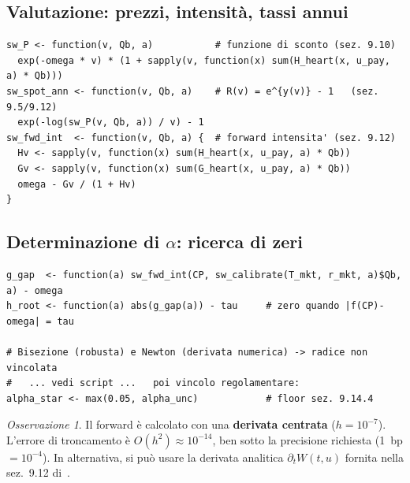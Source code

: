 \documentclass[11pt,a4paper]{article}
\theoremstyle{plain}
\theoremstyle{definition}
\theoremstyle{remark}
\newtheorem*{osservazione}{Osservazione}
\begin{document}
\subsection{Valutazione: prezzi, intensità, tassi annui}

\begin{codebox}
\begin{Verbatim}[fontsize=\small]
sw_P <- function(v, Qb, a)           # funzione di sconto (sez. 9.10)
  exp(-omega * v) * (1 + sapply(v, function(x) sum(H_heart(x, u_pay, a) * Qb)))
sw_spot_ann <- function(v, Qb, a)    # R(v) = e^{y(v)} - 1   (sez. 9.5/9.12)
  exp(-log(sw_P(v, Qb, a)) / v) - 1
sw_fwd_int  <- function(v, Qb, a) {  # forward intensita' (sez. 9.12)
  Hv <- sapply(v, function(x) sum(H_heart(x, u_pay, a) * Qb))
  Gv <- sapply(v, function(x) sum(G_heart(x, u_pay, a) * Qb))
  omega - Gv / (1 + Hv)
}
\end{Verbatim}
\end{codebox}

\subsection{Determinazione di $\alpha$: ricerca di zeri}

\begin{codebox}[Bisezione e Newton su $g(\alpha)=\tau$ --- Algoritmo~\ref{alg:alpha}]
\begin{Verbatim}[fontsize=\small]
g_gap  <- function(a) sw_fwd_int(CP, sw_calibrate(T_mkt, r_mkt, a)$Qb, a) - omega
h_root <- function(a) abs(g_gap(a)) - tau     # zero quando |f(CP)-omega| = tau

# Bisezione (robusta) e Newton (derivata numerica) -> radice non vincolata
#   ... vedi script ...   poi vincolo regolamentare:
alpha_star <- max(0.05, alpha_unc)            # floor sez. 9.14.4
\end{Verbatim}
\end{codebox}

\begin{osservazione}
Il forward \`e calcolato con una \textbf{derivata centrata}
($h = 10^{-7}$). L'errore di troncamento \`e $O(h^2) \approx 10^{-14}$,
ben sotto la precisione richiesta (1~bp $= 10^{-4}$). In alternativa,
si pu\`o usare la derivata analitica $\partial_t W(t,u)$ fornita nella sez.~9.12
di~\cite{eiopa2025}.
\end{osservazione}

\end{document}
